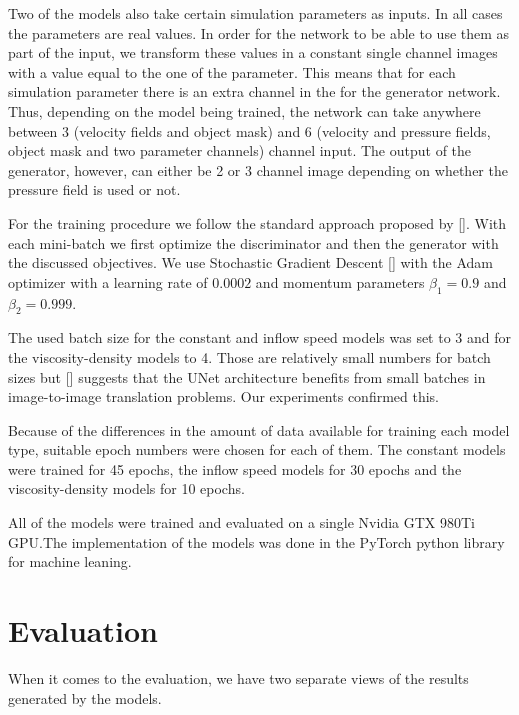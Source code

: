 \documentclass{llncs}
\begin{document}
Two of the models also take certain simulation parameters as inputs. In all cases the parameters are real values. In order for the network to be able to use them as part of the input, we transform these values in a constant single channel images with a value equal to the one of the parameter. This means that for each simulation parameter there is an extra channel in the for the generator network. Thus, depending on the model being trained, the network can take anywhere between 3 (velocity fields and object mask) and 6 (velocity and pressure fields, object mask and two parameter channels) channel input. The output of the generator, however, can either be 2 or 3 channel image depending on whether the pressure field is used or not.

For the training procedure we follow the standard approach proposed by []. With each mini-batch we first optimize the discriminator and then the generator with the discussed objectives. We use Stochastic Gradient Descent [] with the Adam optimizer with a learning rate of $0.0002$ and momentum parameters $\beta_1=0.9$ and $\beta_2=0.999$.

The used batch size for the constant and inflow speed models was set to 3 and for the viscosity-density models to 4. Those are relatively small numbers for batch sizes but [] suggests that the UNet architecture benefits from small batches in image-to-image translation problems. Our experiments confirmed this.

Because of the differences in the amount of data available for training each model type, suitable epoch numbers were chosen for each of them. The constant models were trained for 45 epochs, the inflow speed models for 30 epochs and the viscosity-density models for 10 epochs.

All of the models were trained and evaluated on a single Nvidia GTX 980Ti GPU.\@ The implementation of the models was done in the PyTorch python library for machine leaning.

\section{Evaluation}\label{eval}

When it comes to the evaluation, we have two separate views of the results generated by the models.
\end{document}
